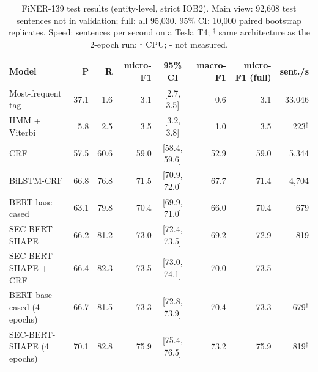 \begin{table}[t]
\centering\small
\begin{tabular}{lrrrcrrr}
\toprule
Model & P & R & micro-F1 & 95\% CI & macro-F1 & micro-F1 (full) & sent./s \\
\midrule
Most-frequent tag & 37.1 & 1.6 & 3.1 & [2.7, 3.5] & 0.6 & 3.1 & 33{,}046 \\
HMM + Viterbi & 5.8 & 2.5 & 3.5 & [3.2, 3.8] & 1.0 & 3.5 & 223$^\ddagger$ \\
CRF & 57.5 & 60.6 & 59.0 & [58.4, 59.6] & 52.9 & 59.0 & 5{,}344 \\
BiLSTM-CRF & 66.8 & 76.8 & 71.5 & [70.9, 72.0] & 67.7 & 71.4 & 4{,}704 \\
BERT-base-cased & 63.1 & 79.8 & 70.4 & [69.9, 71.0] & 66.0 & 70.4 & 679 \\
SEC-BERT-SHAPE & 66.2 & 81.2 & 73.0 & [72.4, 73.5] & 69.2 & 72.9 & 819 \\
SEC-BERT-SHAPE + CRF & 66.4 & 82.3 & 73.5 & [73.0, 74.1] & 70.0 & 73.5 & - \\
BERT-base-cased (4 epochs) & 66.7 & 81.5 & 73.3 & [72.8, 73.9] & 70.4 & 73.3 & 679$^\dagger$ \\
SEC-BERT-SHAPE (4 epochs) & 70.1 & 82.8 & 75.9 & [75.4, 76.5] & 73.2 & 75.9 & 819$^\dagger$ \\
\bottomrule
\end{tabular}
\caption{FiNER-139 test results (entity-level, strict IOB2). Main view: 92,608 test sentences not in validation; full: all 95,030. 95\% CI: 10{,}000 paired bootstrap replicates. Speed: sentences per second on a Tesla T4; $^\dagger$ same architecture as the 2-epoch run; $^\ddagger$ CPU; - not measured.}
\label{tab:results}
\end{table}
